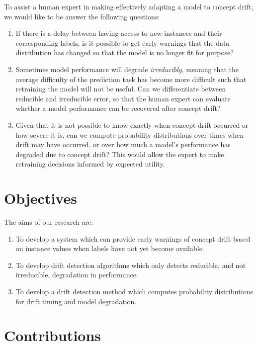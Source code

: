 
To assist a human expert in making effectively adapting a model to concept drift, we would like to be answer the following questions:
\begin{enumerate}
  \item If there is a delay between having access to new instances and their corresponding labels, is it possible to get early warnings that the data distribution has changed so that the model is no longer fit for purpose?
  \item Sometimes model performance will degrade {\it irreducibly}, meaning that the average difficulty of the prediction task has become more difficult such that retraining the model will not be useful. Can we differentiate between reducible and irreducible error, so that the human expert can evaluate whether a model performance can be recovered after concept drift?
  \item Given that it is not possible to know exactly when concept drift occurred or how severe it is, can we compute probability distributions over times when drift may have occurred, or over how much a model's performance has degraded due to concept drift? This would allow the expert to make retraining decisions informed by expected utility.
\end{enumerate}

\section{Objectives}

The aims of our research are:
\begin{enumerate}
  \item To develop a system which can provide early warnings of concept drift based on instance values when labels have not yet become available.
  \item To develop drift detection algorithms which only detects reducible, and not irreducible, degradation in performance.
  \item To develop a drift detection method which computes probability distributions for drift timing and model degradation.
\end{enumerate}

\section{Contributions}

